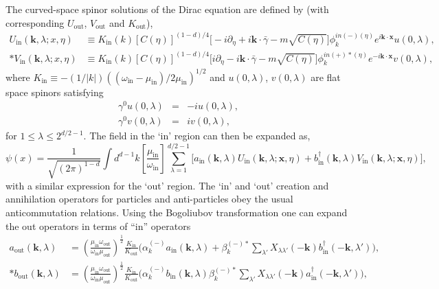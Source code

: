 The curved-space spinor solutions of the Dirac equation are defined by (with corresponding $U_{\text{out}}$, $V_{\text{out}}$ and $K_{\text{out}}$),
\begin{align}
\nonumber U_{\text{in}}(\bm{k},\lambda;x,\eta)&\equiv K_{\text{in}}(k)[C(\eta)]^{(1-d)/4}\Big[-i\partial_\eta+i{\bm{k}}\cdot\bar{\gamma}-m\sqrt{C(\eta)}\Big]\phi_{k}^{in(-)(\eta)}e^{i\bm{k}\cdot
{\bm{x}}}u(0,\lambda),\\*
\nonumber V_{\text{in}}(\bm{k},\lambda;x,\eta)&\equiv
K_{\text{in}}(k)[C(\eta)]^{(1-d)/4}\Big[i\partial_\eta-i{\bm{k}}\cdot\bar{\gamma}-m\sqrt{C(\eta)}\Big]\phi_{k}^{in(+)\ast(\eta)}e^{-i\bm{k}\cdot
{\bm{x}}}v(0,\lambda),
\end{align}
where $K_{\text{in}}\equiv-(1/|k|)((\omega_{\text{in}}-\mu_{\text{in}})/2\mu_{\text{in}})^{1/2}$ and $u(0,\lambda)$, $v(0,\lambda)$ are flat space spinors satisfying
\begin{eqnarray}
\gamma^0u(0,\lambda)&=&-iu(0,\lambda),\nonumber\\
\gamma^0v(0,\lambda)&=& iv(0,\lambda),\nonumber
\end{eqnarray}
for $1\leq\lambda\leq2^{d/2-1}$. The field in the `in' region can
then be expanded as,
\begin{equation}
 \psi(x)=\frac{1}{\sqrt{(2\pi)^{1-d}}}\int
d^{d-1}k\left[\frac{\mu_{\text{in}}}{\omega_{\text{in}}}\right]\sum_{\lambda=1}^{d/2-1}
\big[a_{\text{in}}({\bm k},\lambda)U_{\text{in}}({\bm k},\lambda;\bm{x},\eta)+
 b^{\dag}_{\text{in}}({\bm k},\lambda)V_{\text{in}}({\bm k},\lambda;\bm{x},\eta)\big],
\end{equation} 
with a similar expression for the `out' region.  The `in'
and `out' creation and annihilation operators for particles and
anti-particles obey the usual anticommutation relations. Using the
Bogoliubov transformation one can expand the out  operators in
terms of ``in'' operators 
\begin{align}
a_{\text{out}}(\bm k,\lambda)&=\nonumber\left(\frac{\mu_{\text{in}}\omega_{\text{out}}}{\omega_{\text{in}}\mu_{\text{out}}}\right)^{\frac{1}{2}}
\frac{K_{\text{in}}}{K_{\text{out}}}\Bigg(\alpha_{k}^{(-)}a_{\text{in}}(\bm k,\lambda)+\beta_{k}^{(-)\ast}\sum_{\lambda'}
X_{\lambda\lambda'}(-{\bm k})b^{\dag}_{\text{in}}(-{\bm k},\lambda')\Bigg),\\*
 b_{\text{out}}(\bm k,\lambda)&=\left(\frac{\mu_{\text{in}}\omega_{\text{out}}}{\omega_{\text{in}}\mu_{\text{out}}}\right)^{\frac{1}{2}}
\frac{K_{\text{in}}}{K_{\text{out}}}\Bigg(\alpha_{k}^{(-)}b_{\text{in}}(\bm k,\lambda)\beta_{k}^{(-)\ast}\sum_{\lambda'}
X_{\lambda\lambda'}(-{\bm k})a^{\dag}_{\text{in}}(-{\bm k},\lambda')\Bigg),
\end{align}
